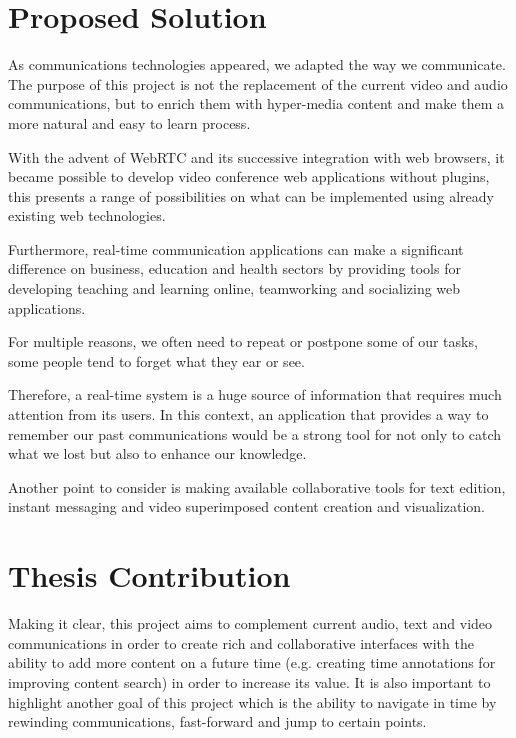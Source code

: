      

\section{Proposed Solution}
\label{section:proposed}

	As communications technologies appeared, we adapted the way we communicate. {\color{blue} The purpose of this project is not the replacement of} the current video and audio communications, but to enrich them with hyper-media content and make them a more natural and easy to learn process. 

	{\color{blue}With the advent of WebRTC and its successive integration with web browsers, it became possible to develop video conference web applications without plugins, this presents a range of possibilities on what can be implemented using already existing web technologies.}
		
    Furthermore, real-time communication applications can make a significant difference on business, education and health sectors by providing tools for developing teaching and learning online, teamworking and socializing web applications.

	For multiple reasons, we often need to repeat or postpone some of our tasks, some people tend to forget what they ear or see.
        
	Therefore, a real-time system is a huge source of information that requires much attention from its users. In this context, an application that provides a way to remember our past communications would be a strong tool for not only to catch what we lost but also to enhance our knowledge.


	{\color{blue}Another point to consider is making available collaborative tools for text edition, instant messaging and video superimposed content creation and visualization.}


        

\section{Thesis Contribution}
\label{section:contribution}

Making it clear, this project aims to complement current audio, text and video communications in order to create rich and collaborative interfaces with the ability to add more content on a future time (e.g. creating time annotations for improving content search) in order to increase its value. It is also important to highlight another goal of this project which is the ability to navigate in time by rewinding communications, fast-forward and jump to certain points.

